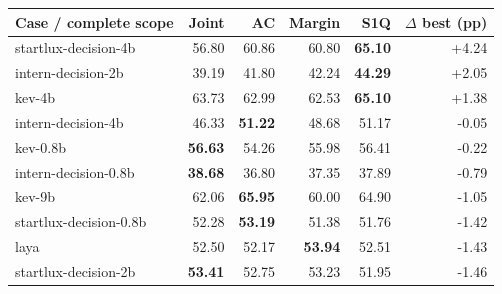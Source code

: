 \begin{tabular}{lrrrrr}
\toprule
Case / complete scope & Joint & AC & Margin & S1Q & $\Delta$ best (pp) \\
\midrule
startlux-decision-4b & 56.80 & 60.86 & 60.80 & \textbf{65.10} & +4.24 \\
intern-decision-2b & 39.19 & 41.80 & 42.24 & \textbf{44.29} & +2.05 \\
kev-4b & 63.73 & 62.99 & 62.53 & \textbf{65.10} & +1.38 \\
intern-decision-4b & 46.33 & \textbf{51.22} & 48.68 & 51.17 & -0.05 \\
kev-0.8b & \textbf{56.63} & 54.26 & 55.98 & 56.41 & -0.22 \\
intern-decision-0.8b & \textbf{38.68} & 36.80 & 37.35 & 37.89 & -0.79 \\
kev-9b & 62.06 & \textbf{65.95} & 60.00 & 64.90 & -1.05 \\
startlux-decision-0.8b & 52.28 & \textbf{53.19} & 51.38 & 51.76 & -1.42 \\
laya & 52.50 & 52.17 & \textbf{53.94} & 52.51 & -1.43 \\
startlux-decision-2b & \textbf{53.41} & 52.75 & 53.23 & 51.95 & -1.46 \\
\bottomrule
\end{tabular}
